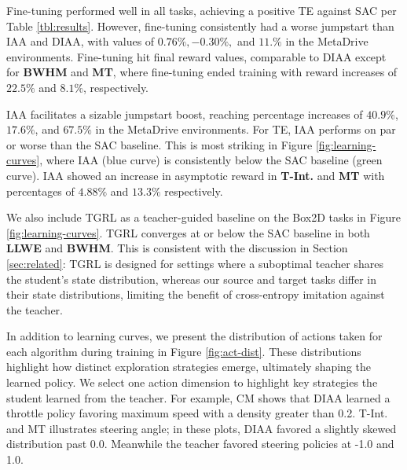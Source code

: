 \documentclass{article} %
\begin{document}
Fine-tuning performed well in all tasks, achieving a positive TE against SAC per Table \ref{tbl:results}. However, fine-tuning consistently had a worse jumpstart than IAA and DIAA, with values of $0.76\%, -0.30\%,$ and $11.\%$ in the MetaDrive environments. Fine-tuning hit final reward values, comparable to DIAA except for \textbf{BWHM} and \textbf{MT}, where fine-tuning ended training with reward increases of $22.5\%$ and $8.1\%$, respectively.

IAA facilitates a sizable jumpstart boost, reaching percentage increases of $40.9\%$, $17.6\%$, and $67.5\%$ in the MetaDrive environments. For TE, IAA performs on par or worse than the SAC baseline. This is most striking in Figure \ref{fig:learning-curves}, where IAA (blue curve) is consistently below the SAC baseline (green curve). IAA showed an increase in asymptotic reward in \textbf{T-Int.} and \textbf{MT} with percentages of $4.88\%$ and $13.3\%$ respectively.

We also include TGRL \citep{shenfeld2023tgrl} as a teacher-guided baseline on the Box2D tasks in Figure \ref{fig:learning-curves}. TGRL converges at or below the SAC baseline in both \textbf{LLWE} and \textbf{BWHM}. This is consistent with the discussion in Section \ref{sec:related}: TGRL is designed for settings where a suboptimal teacher shares the student's state distribution, whereas our source and target tasks differ in their state distributions, limiting the benefit of cross-entropy imitation against the teacher.

In addition to learning curves, we present the distribution of actions taken for each algorithm during training in Figure \ref{fig:act-dist}. These distributions highlight how distinct exploration strategies emerge, ultimately shaping the learned policy. We select one action dimension to highlight key strategies the student learned from the teacher. For example, CM shows that DIAA learned a throttle policy favoring maximum speed with a density greater than 0.2. T-Int. and MT illustrates steering angle; in these plots, DIAA favored a slightly skewed distribution past 0.0. Meanwhile the teacher favored steering policies at -1.0 and 1.0.
\end{document}
